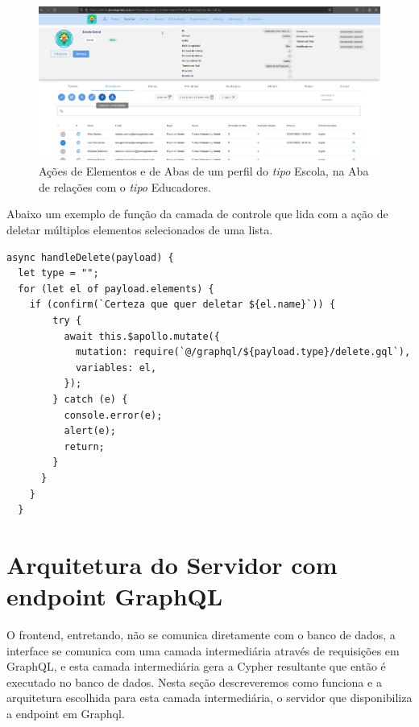 \begin{figure}
    \centering
    \includegraphics[width=1\linewidth]{Imagens/chap04/front-other-actions.png}
    \caption{Ações de Elementos e de Abas de um perfil do \textit{tipo} Escola, na Aba de relações com o \textit{tipo} Educadores.}
    \label{fig:enter-label}
\end{figure}


Abaixo um exemplo de função da camada de controle que lida com a ação de deletar múltiplos elementos selecionados de uma lista.

\begin{lstlisting}
async handleDelete(payload) {
  let type = "";
  for (let el of payload.elements) {
    if (confirm(`Certeza que quer deletar ${el.name}`)) {
        try {
          await this.$apollo.mutate({
            mutation: require(`@/graphql/${payload.type}/delete.gql`),
            variables: el,
          });
        } catch (e) {
          console.error(e);
          alert(e);
          return;
        }
      }
    }
  }
\end{lstlisting}

\section{Arquitetura do Servidor com endpoint GraphQL}

O frontend, entretando, não se comunica diretamente com o banco de dados, a interface se comunica com uma camada intermediária através de requisições em GraphQL, e esta camada intermediária gera a Cypher resultante que então é executado no banco de dados. Nesta seção descreveremos como funciona e a arquitetura escolhida para esta camada intermediária, o servidor que disponibiliza a endpoint em Graphql.

